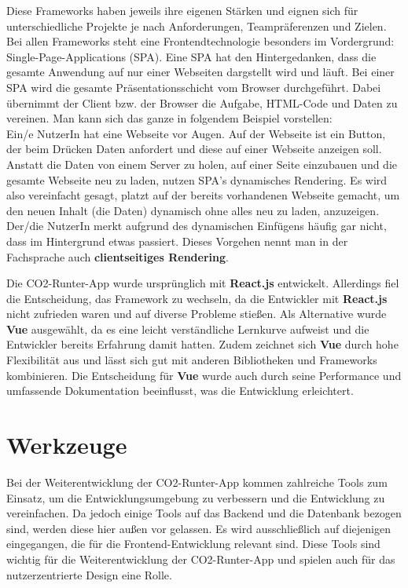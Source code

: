 Diese Frameworks haben jeweils ihre eigenen Stärken und eignen sich für unterschiedliche Projekte je nach Anforderungen, Teampräferenzen und Zielen.\cite{angular-vuejs-reactjs-comparison:3, angular-vuejs-reactjs-comparison:4}
Bei allen Frameworks steht eine Frontendtechnologie besonders im Vordergrund: Single-Page-Applications (\acs{SPA}).
Eine \acs{SPA} hat den Hintergedanken, dass die gesamte Anwendung auf nur einer Webseiten dargstellt wird und läuft. \cite*{spa}
Bei einer \acs{SPA} wird die gesamte Präsentationsschicht vom Browser durchgeführt.
Dabei übernimmt der Client bzw. der Browser die Aufgabe, \acs{HTML}-Code und Daten zu vereinen. \cite{spa}
Man kann sich das ganze in folgendem Beispiel vorstellen:\\
Ein/e NutzerIn hat eine Webseite vor Augen. Auf der Webseite ist ein Button, der beim Drücken Daten anfordert und diese auf einer Webseite anzeigen soll.
Anstatt die Daten von einem Server zu holen, auf einer Seite einzubauen und die gesamte Webseite neu zu laden, nutzen \acs{SPA}'s dynamisches Rendering.
Es wird also vereinfacht gesagt, platzt auf der bereits vorhandenen Webseite gemacht, um den neuen Inhalt (die Daten) dynamisch ohne alles neu zu laden, anzuzeigen.
Der/die NutzerIn merkt aufgrund des dynamischen Einfügens häufig gar nicht, dass im Hintergrund etwas passiert.
Dieses Vorgehen nennt man in der Fachsprache auch \textbf{clientseitiges Rendering}.

Die CO2-Runter-App wurde ursprünglich mit \textbf{React.js} entwickelt. Allerdings fiel die Entscheidung, das Framework zu wechseln, da die Entwickler mit \textbf{React.js} nicht zufrieden waren und auf diverse Probleme stießen. Als Alternative wurde \textbf{Vue} ausgewählt, da es eine leicht verständliche Lernkurve aufweist und die Entwickler bereits Erfahrung damit hatten. Zudem zeichnet sich \textbf{Vue} durch hohe Flexibilität aus und lässt sich gut mit anderen Bibliotheken und Frameworks kombinieren. Die Entscheidung für \textbf{Vue} wurde auch durch seine Performance und umfassende Dokumentation beeinflusst, was die Entwicklung erleichtert.

\section{Werkzeuge}
\label{chapter:3-werkzeuge}

Bei der Weiterentwicklung der CO2-Runter-App kommen zahlreiche Tools zum Einsatz, um die Entwicklungsumgebung zu verbessern und die Entwicklung zu vereinfachen. Da jedoch einige Tools auf das Backend und die Datenbank bezogen sind, werden diese hier außen vor gelassen. Es wird ausschließlich auf diejenigen eingegangen, die für die Frontend-Entwicklung relevant sind. Diese Tools sind wichtig für die Weiterentwicklung der CO2-Runter-App und spielen auch für das nutzerzentrierte Design eine Rolle.

